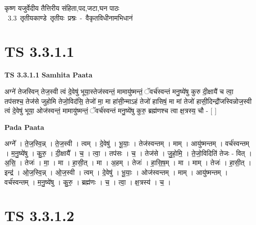 \documentclass[17pt]{extarticle}
\begin{document}
\begin{titlepage}
    \begin{center}
 
\begin{sanskrit}
    { \Huge
    कृष्ण यजुर्वेदीय तैत्तिरीय संहिता,पद,जटा,घन पाठः 
    }
    \\
    \vspace{2.5cm}
    \mbox{ \Huge
    3.3     तृतीयकाण्डे तृतीयः प्रश्नः - वैकृतविधीनामभिधानं   }
\end{sanskrit}
\end{center}

\end{titlepage}
\tableofcontents
\pagebreak

\section*{ TS 3.3.1.1 }

\textbf{TS 3.3.1.1 } \newline
\textbf{Samhita Paata} \newline

अग्ने॑ तेजस्विन् तेज॒स्वी त्वं दे॒वेषु॑ भूया॒स्तेज॑स्वन्तं॒ मामायु॑ष्मन्तं॒ ॅवर्च॑स्वन्तं मनु॒ष्ये॑षु कुरु दी॒क्षायै॑ च त्वा॒ तप॑सश्च॒ तेज॑से जुहोमि तेजो॒विद॑सि॒ तेजो॑ मा॒ मा हा॑सी॒न्माऽहं तेजो॑ हासिषं॒ मा मां तेजो॑ हासी॒दिन्द्रौ॑जस्विन्नोज॒स्वी त्वं दे॒वेषु॑ भूया॒ ओज॑स्वन्तं॒ मामायु॑ष्मन्तं॒ ॅवर्च॑स्वन्तं मनु॒ष्ये॑षु कुरु॒ ब्रह्म॑णश्च त्वा क्ष॒त्रस्य॒ चौ - [  ] \newline

\textbf{Pada Paata} \newline

अग्ने᳚ । ते॒ज॒स्वि॒न्न् । ते॒ज॒स्वी । त्वम् । दे॒वेषु॑ । भू॒याः॒ । तेज॑स्वन्तम् । माम् । आयु॑ष्मन्तम् । वर्च॑स्वन्तम् । म॒नु॒ष्ये॑षु । कु॒रु॒ । दी॒क्षायै᳚ । च॒ । त्वा॒ । तप॑सः । च॒ । तेज॑से । जु॒हो॒मि॒ । ते॒जो॒विदिति॑ तेजः - वित् । अ॒सि॒ । तेजः॑ । मा॒ । मा । हा॒सी॒त् । मा । अ॒हम् । तेजः॑ । हा॒सि॒ष॒म् । मा । माम् । तेजः॑ । हा॒सी॒त् । इन्द्र॑ । ओ॒ज॒स्वि॒न्न् । ओ॒ज॒स्वी । त्वम् । दे॒वेषु॑ । भू॒याः॒ । ओज॑स्वन्तम् । माम् । आयु॑ष्मन्तम् । वर्च॑स्वन्तम् । म॒नु॒ष्ये॑षु । कु॒रु॒ । ब्रह्म॑णः । च॒ । त्वा॒ । क्ष॒त्रस्य॑ । च॒ ।  \newline




\section*{ TS 3.3.1.2 }
\end{document}
